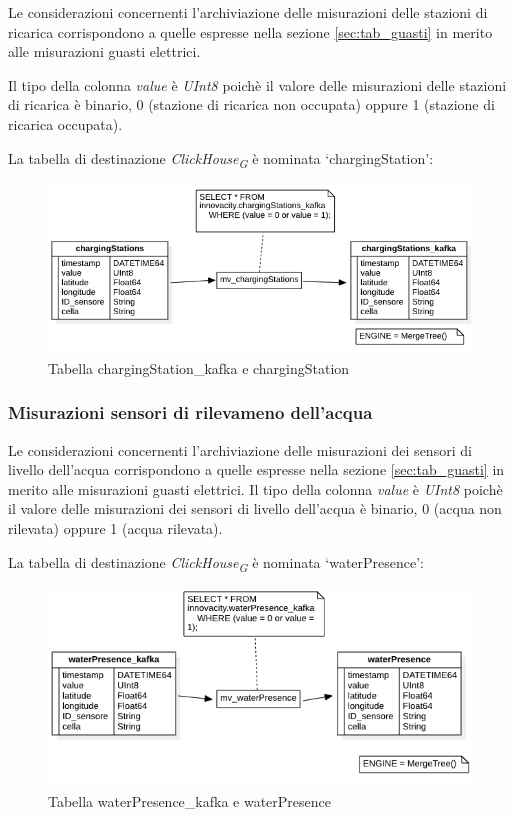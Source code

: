 Le considerazioni concernenti l'archiviazione delle misurazioni delle stazioni di ricarica corrispondono a quelle espresse nella sezione \ref{sec:tab_guasti} in merito alle misurazioni guasti elettrici.

Il tipo della colonna \textit{value} è \textit{UInt8} poichè il valore delle misurazioni delle stazioni di ricarica è binario, 0 (stazione di ricarica non occupata) oppure 1 (stazione di ricarica occupata).

La tabella di destinazione \textit{ClickHouse}\textsubscript{\textit{G}} è nominata ‘chargingStation’:

\begin{figure}[H]
    \centering
    \includegraphics[width=1\textwidth]{../Images/SpecificaTecnica/chargingStations.png}
    \caption{Tabella chargingStation\_kafka e chargingStation}
    \label{fig:chargingStation_tables}
\end{figure}

\subsubsection{Misurazioni sensori di rilevameno dell’acqua}
Le considerazioni concernenti l'archiviazione delle misurazioni dei sensori di livello dell'acqua corrispondono a quelle espresse nella sezione \ref{sec:tab_guasti} in merito alle misurazioni guasti elettrici. Il tipo della colonna \textit{value} è \textit{UInt8} poichè il valore delle misurazioni dei sensori di livello dell'acqua è binario, 0 (acqua non rilevata) oppure 1 (acqua rilevata).

La tabella di destinazione \textit{ClickHouse}\textsubscript{\textit{G}} è nominata ‘waterPresence’:

\begin{figure}[H]
	\centering
	\includegraphics[width=1\textwidth]{../Images/SpecificaTecnica/waterPresence.png}
	\caption{Tabella waterPresence\_kafka e waterPresence}
	\label{fig:waterPresence_tables}
\end{figure}


